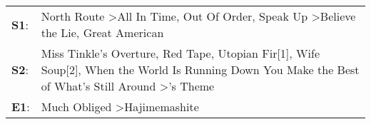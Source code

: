 \begin{supertabular}{p{0.03\textwidth}p{0.92\textwidth}}
 \textbf{S1}:  &                                                        North Route\textsuperscript{} \textgreater \enspace All In Time\textsuperscript{}, \enspace Out Of Order\textsuperscript{}, \enspace Speak Up\textsuperscript{} \textgreater \enspace Believe the Lie\textsuperscript{}, \enspace Great American\textsuperscript{}  \enspace  \\
 \textbf{S2}:  &  Miss Tinkle's Overture\textsuperscript{}, \enspace Red Tape\textsuperscript{}, \enspace Utopian Fir[1]\textsuperscript{}, \enspace Wife Soup[2]\textsuperscript{}, \enspace When the World Is Running Down You Make the Best of What's Still Around\textsuperscript{} \textgreater {}'s Theme\textsuperscript{}  \enspace  \\
 \textbf{E1}:  &                                                                                                                                                                                                                                      Much Obliged\textsuperscript{} \textgreater \enspace Hajimemashite\textsuperscript{}  \enspace  \\
\end{supertabular}
